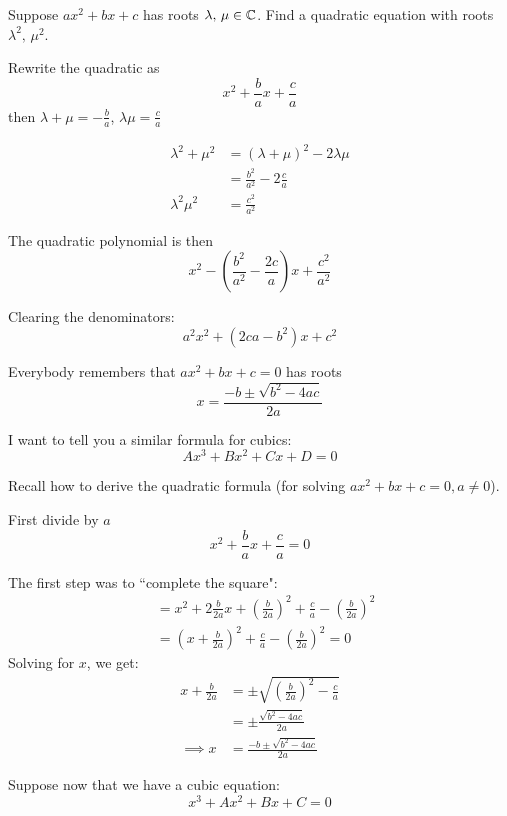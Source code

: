 \documentclass[twoside]{scrartcl}
\begin{document}
\begin{example}
Suppose $ax^2 + bx + c$ has roots $\lambda,\, \mu \in\mathbb{C}$. Find a quadratic equation with roots $\lambda^2,\, \mu^2$. 

Rewrite the quadratic as
\[x^2 + \frac{b}{a}x + \frac{c}{a}\]
then $\lambda + \mu = -\frac{b}{a}$, $\lambda\mu = \frac{c}{a}$

\[
\begin{aligned}
  \lambda^2 + \mu^2 &= (\lambda + \mu)^2 - 2\lambda\mu\\
  &= \frac{b^2}{a^2} - 2\frac{c}{a}\\[0.3cm] 
\lambda^2\mu^2 &= \frac{c^2}{a^2}
\end{aligned}
\]

The quadratic polynomial is then 
\[x^2 - \textstyle{(\frac{b^2}{a^2} - \frac{2c}{a})x + \frac{c^2}{a^2}}\]

Clearing the denominators: 
\[a^2x^2 + (2ca - b^2)x + c^2\]

\end{example}
\vspace*{5pt}

Everybody remembers that $ax^2 + bx + c = 0$ has roots  
\[x = \frac{-b\pm \sqrt{b^2 - 4ac}}{2a}\]

I want to tell you a similar formula for cubics: 
\[Ax^3 + Bx^2 + Cx + D = 0\]

Recall how to derive the quadratic formula (for solving $ax^2 + bx + c = 0, a \neq 0$).

First divide by $a$
\[x^2 + \frac{b}{a}x + \frac{c}{a} = 0\]

The first step was to ``complete the square": 
\[
\begin{aligned}
  &= x^2 + 2\frac{b}{2a}x + \left(\frac{b}{2a}\right)^2 + \frac{c}{a} - \left(\frac{b}{2a}\right)^2\\
  &= \left(x + \frac{b}{2a}\right)^2 + \frac{c}{a} - \left(\frac{b}{2a}\right)^2 = 0
\end{aligned}
\]
Solving for $x$, we get:
\[
\begin{aligned}
  x + \frac{b}{2a} &= \textstyle{\pm\sqrt{\left(\frac{b}{2a}\right)^2 - \frac{c}{a}}}\\[0.2cm]
  &= \pm \frac{\sqrt{b^2 - 4ac}}{2a}\\[0.2cm]
  \implies x &= \frac{-b \pm\sqrt{b^2 - 4ac}}{2a}
\end{aligned}
\]

Suppose now that we have a cubic equation:
\[x^3 + Ax^2 + Bx + C = 0\]
\end{document}
